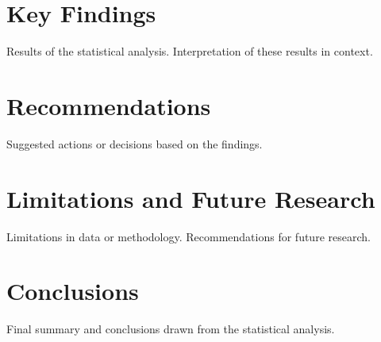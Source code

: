 \documentclass[12pt]{article}
\begin{document}
\section{Key Findings}

Results of the statistical analysis.
Interpretation of these results in context.

\section{Recommendations}

Suggested actions or decisions based on the findings.

\section{Limitations and Future Research}

Limitations in data or methodology.
Recommendations for future research.

\section{Conclusions}

Final summary and conclusions drawn from the statistical analysis.


\newpage
%
%

 
\end{document}
